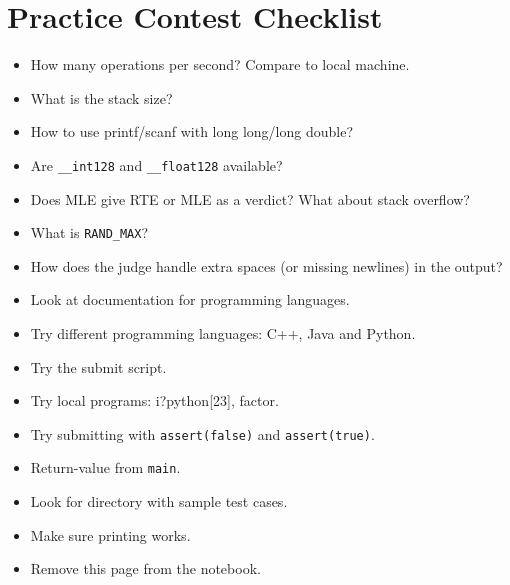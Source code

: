   \section*{Practice Contest Checklist}
    \begin{itemize}
      \item How many operations per second? Compare to local machine.
      \item What is the stack size?
      \item How to use printf/scanf with long long/long double?
      \item Are \texttt{\_{}\_{}int128} and \texttt{\_{}\_{}float128} available?
      \item Does MLE give RTE or MLE as a verdict? What about stack overflow?
      \item What is \texttt{RAND\_{}MAX}?
      \item How does the judge handle extra spaces (or missing newlines) in the output?
      \item Look at documentation for programming languages.
      \item Try different programming languages: C++, Java and Python.
      \item Try the submit script.
      \item Try local programs: i?python[23], factor.
      \item Try submitting with \texttt{assert(false)} and \texttt{assert(true)}.
      \item Return-value from \texttt{main}.
      \item Look for directory with sample test cases.
      \item Make sure printing works.

      \item Remove this page from the notebook.
    \end{itemize}
\fi
